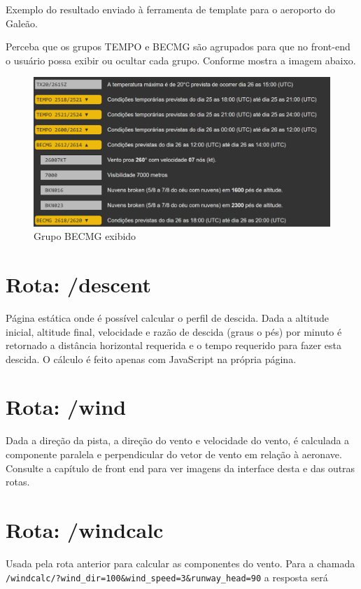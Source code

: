 Exemplo do resultado enviado à ferramenta de template para o aeroporto do Galeão.




Perceba que os grupos TEMPO e BECMG são agrupados para que no front-end o usuário 
possa exibir ou ocultar cada grupo. Conforme mostra a imagem abaixo.


\begin{figure}[ht]
    \begin{center}
    \includegraphics[width=400pt]{img/BECMG-exibido.png}
    \caption{Grupo BECMG exibido}
    \label{fig:becmg-exibido}
    \end{center}
\end{figure}

\section{Rota: /descent}

Página estática onde é possível calcular o perfil de descida. Dada a altitude
inicial, altitude final, velocidade e razão de descida (graus o pés) por minuto
é retornado a distância horizontal requerida e o tempo requerido para fazer esta
descida. O cálculo é feito apenas com JavaScript na própria página.

\section{Rota: /wind}
Dada a direção da pista, a direção do vento e velocidade do vento, é calculada
a componente paralela e perpendicular do vetor de vento em relação à aeronave.
Consulte a capítulo de front end para ver imagens da interface desta e das outras
rotas.

\section{Rota: /windcalc}
Usada pela rota anterior para calcular as componentes do vento. Para a chamada
\verb|/windcalc/?wind_dir=100&wind_speed=3&runway_head=90| a resposta será

